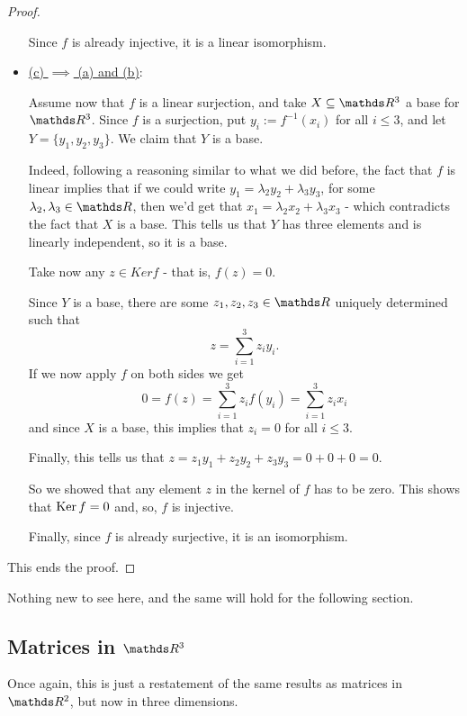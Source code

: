 \begin{proof}
\begin{itemize}
		Since $f$ is already injective, it is a linear isomorphism.
		
		\item \underline{(c) $\implies$ (a) and (b)}:
		
		Assume now that $f$ is a linear surjection, and take $X\subseteq\R^3$ a base for $\R^3$. Since $f$ is a surjection, put $y_i:=f^{-1}(x_i)$ for all $i\leq 3$, and let $Y=\{y_1,y_2,y_3\}$. We claim that $Y$ is a base.
		
		Indeed, following a reasoning similar to what we did before, the fact that $f$ is linear implies that if we could write $y_1=\lambda_2y_2+\lambda_3y_3$, for some $\lambda_2,\lambda_3\in \R$, then we'd get that $x_1=\lambda_2x_2+\lambda_3x_3$ - which contradicts the fact that $X$ is a base. This tells us that $Y$ has three elements and is linearly independent, so it is a base.
		
		Take now any $z\in Ker f$ - that is, $f(z)=0$.
		
		Since $Y$ is a base, there are some $z_1,z_2,z_3\in\R$ uniquely determined such that 
		\[z=\sum_{i=1}^3z_iy_i.\]If we now apply $f$ on both sides we get
		\[0=f(z)=\sum_{i=1}^3z_if(y_i)=\sum_{i=1}^3z_ix_i\]and since $X$ is a base, this implies that $z_i=0$ for all $i\leq 3$.
		
		Finally, this tells us that $z=z_1y_1+z_2y_2+z_3y_3=0+0+0=0$.
		
		So we showed that any element $z$ in the kernel of $f$ has to be zero. This shows that $\operatorname{Ker} f=0$ and, so, $f$ is injective.
		
		Finally, since $f$ is already surjective, it is an isomorphism.
	\end{itemize}

This ends the proof.
\end{proof}

Nothing new to see here, and the same will hold for the following section.

\newpage
\subsection{Matrices in $\R^3$}

Once again, this is just a restatement of the same results as matrices in $\R^2$, but now in three dimensions.


